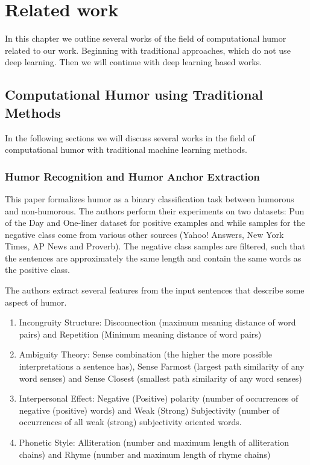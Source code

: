 \documentclass[draft,final,oneside]{vutinfth} %
\begin{document}

\section{Related work} \label{relatedworkbackground}

In this chapter we outline several works of the field of computational humor related to our work. Beginning with traditional approaches, which do not use deep learning. Then we will continue with deep learning based works.


\subsection{Computational Humor using Traditional Methods}

In the following sections we will discuss several works in the field of computational humor with traditional machine learning methods.

\subsubsection{Humor Recognition and Humor Anchor Extraction \cite{Yang2015HumorRA}}

This paper formalizes humor as a binary classification task between humorous and non-humorous. The authors perform their experiments on two datasets: Pun of the Day and One-liner dataset for positive examples and while samples for the negative class come from various other sources (Yahoo! Answers, New York Times, AP News and Proverb). The negative class samples are filtered, such that the sentences are approximately the same length and contain the same words as the positive class.

The authors extract several features from the input sentences that describe some aspect of humor.

\begin{enumerate}
\item Incongruity Structure: Disconnection (maximum meaning distance of word pairs) and Repetition (Minimum meaning distance of word pairs)
\item Ambiguity Theory: Sense combination (the higher the more possible interpretations a sentence has), Sense Farmost (largest path similarity of any word senses) and Sense Closest (smallest path similarity of any word senses)
\item Interpersonal Effect: Negative (Positive) polarity (number of occurrences of negative (positive) words) and Weak (Strong) Subjectivity (number of occurrences of all weak (strong) subjectivity oriented words.
\item Phonetic Style: Alliteration (number and maximum length of alliteration chains) and Rhyme (number and maximum length of rhyme chains)
\end{enumerate}
\end{document}
